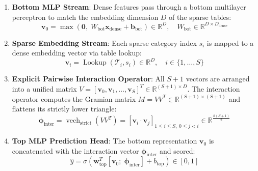 \documentclass[11pt,a4paper]{article}
\theoremstyle{definition}
\begin{document}
\begin{enumerate}
    \item \textbf{Bottom MLP Stream}: Dense features pass through a bottom multilayer perceptron to match the embedding dimension $D$ of the sparse tables:
    {\boldmath
    \begin{equation}
    \mathbf{v}_0 = \max\left( \mathbf{0}, \; W_{\text{bot}} \mathbf{x}_{\text{dense}} + \mathbf{b}_{\text{bot}} \right) \in \mathbb{R}^D, \quad W_{\text{bot}} \in \mathbb{R}^{D \times D_{\text{dense}}}
    \end{equation}
    }
    \item \textbf{Sparse Embedding Stream}: Each sparse category index $s_i$ is mapped to a dense embedding vector via table lookup:
    {\boldmath
    \begin{equation}
    \mathbf{v}_i = \operatorname{Lookup}(\mathcal{T}_i, s_i) \in \mathbb{R}^D, \quad i \in \{1, \dots, S\}
    \end{equation}
    }
    \item \textbf{Explicit Pairwise Interaction Operator}: All $S + 1$ vectors are arranged into a unified matrix $V = [\mathbf{v}_0, \mathbf{v}_1, \dots, \mathbf{v}_S]^T \in \mathbb{R}^{(S+1) \times D}$. The interaction operator computes the Gramian matrix $M = V V^T \in \mathbb{R}^{(S+1) \times (S+1)}$ and flattens its strictly lower triangle:
    {\boldmath
    \begin{equation}
    \boldsymbol{\phi}_{\text{inter}} = \operatorname{vech}_{\text{strict}}(V V^T) = \left[ \mathbf{v}_i \cdot \mathbf{v}_j \right]_{1 \le i \le S, \; 0 \le j < i} \in \mathbb{R}^{\frac{S(S+1)}{2}}
    \end{equation}
    }
    \item \textbf{Top MLP Prediction Head}: The bottom representation $\mathbf{v}_0$ is concatenated with the interaction vector $\boldsymbol{\phi}_{\text{inter}}$ and scored:
    {\boldmath
    \begin{equation}
    \widehat{y} = \sigma\left( \mathbf{w}_{\text{top}}^T [\mathbf{v}_0; \; \boldsymbol{\phi}_{\text{inter}}] + b_{\text{top}} \right) \in [0, 1]
    \end{equation}
    }
\end{enumerate}
\end{document}
